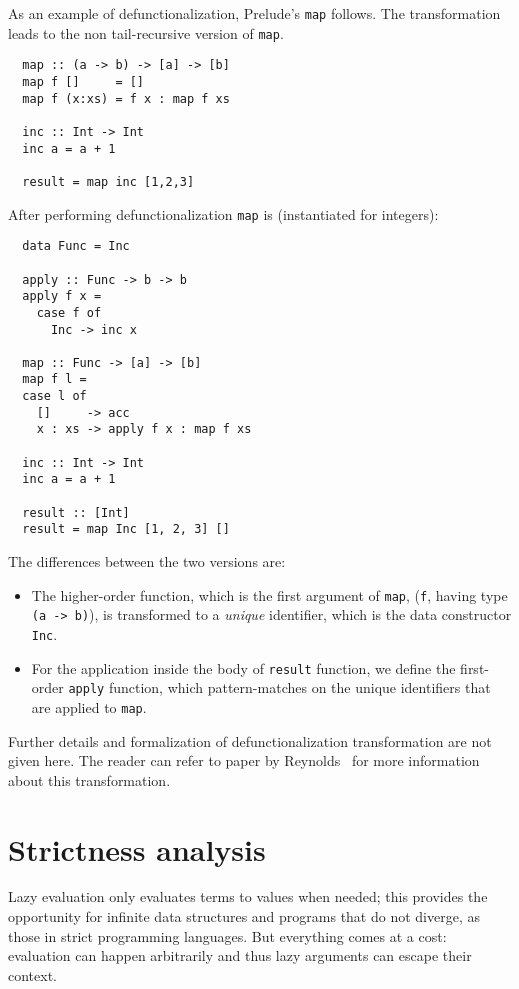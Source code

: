 \documentclass[diploma]{softlab-thesis}
\begin{document}
As an example of defunctionalization, Prelude's \texttt{map} follows. The transformation leads to 
the non tail-recursive version of \texttt{map}.

\begin{verbatim}
  map :: (a -> b) -> [a] -> [b]
  map f []     = []
  map f (x:xs) = f x : map f xs

  inc :: Int -> Int 
  inc a = a + 1
  
  result = map inc [1,2,3]
\end{verbatim}

After performing defunctionalization \texttt{map} is (instantiated for integers):
\begin{verbatim}
  data Func = Inc 

  apply :: Func -> b -> b
  apply f x =
    case f of
      Inc -> inc x

  map :: Func -> [a] -> [b]
  map f l =
  case l of
    []     -> acc
    x : xs -> apply f x : map f xs

  inc :: Int -> Int 
  inc a = a + 1

  result :: [Int]
  result = map Inc [1, 2, 3] []
\end{verbatim}

The differences between the two versions are:
\begin{itemize}
  \item The higher-order function, which is the first argument of \texttt{map}, (\texttt{f}, having type \texttt{(a -> b)}), is 
  transformed to a \textit{unique} identifier, which is the data constructor \texttt{Inc}.
  \item For the application inside the body of \texttt{result} function, we define the first-order \texttt{apply}
  function, which pattern-matches on the unique identifiers that are applied to \texttt{map}.
\end{itemize}

Further details and formalization of defunctionalization transformation are not given here. 
The reader can refer to paper by Reynolds~\cite{Reynolds72definitionalinterpreters} for more information about this transformation.

\section {Strictness analysis}
\label{sec:strictness-analysis}

Lazy evaluation only evaluates terms to values when needed; this provides the 
opportunity for infinite data structures and programs that do not diverge, as those in 
strict programming languages. But everything comes at a cost: evaluation can happen 
arbitrarily and thus lazy arguments can escape their context.
\end{document}
